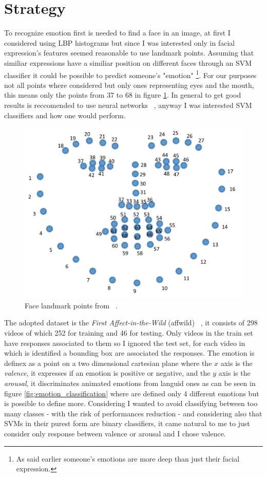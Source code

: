 \section{Strategy}
To recognize emotion first is needed to find a face in an image, at first I considered using LBP histograms but since I was interested only in facial expression's features seemed reasonable to use landmark points. 
Assuming that similiar expressions have a similiar position on different faces through an SVM classifier it could be possible to predict someone's "emotion" \footnote{As said earlier someone's emotions are more deep than just their facial expression.}.
For our purposes not all points where considered but only ones representing eyes and the mouth, this means only the points from 37 to 68 in figure \ref{fig:landmarks}.
In general to get good results is reccomended to use neural networks ~\cite{blog:emotion}, anyway I was interested SVM classifiers and how one would perform.

\begin{figure}[h!t]
    \centering
    \includegraphics[scale=0.2]{images/landmark.png}
    \caption{Face landmark points from ~\cite{landmark:guide}.}
    \label{fig:landmarks}
\end{figure}

The adopted dataset is the \textit{First Affect-in-the-Wild} (affwild) ~\cite{dataset:affwild}, it consists of 298 videos of which 252 for training and 46 for testing.
Only videos in the train set have responses associated to them so I ignored the test set, for each video in which is identified a bounding box are associated the responses.
The emotion is definex as a point on a two dimensional cartesian plane where the $x$ axis is the \textit{valence}, it expresses if an emotion is positive or negative, and the $y$ axis is the \textit{arousal}, it discriminates animated emotions from languid ones as can be seen in figure \ref{fig:emotion_classification} where are defined only 4 different emotions but is possible to define more.
Considering I wanted to avoid classifying between too many classes -  with the risk of performances reduction - and considering also that SVMs in their purest form are binary classifiers, it came natural to me to just consider only response between valence or arousal and I chose valence.

